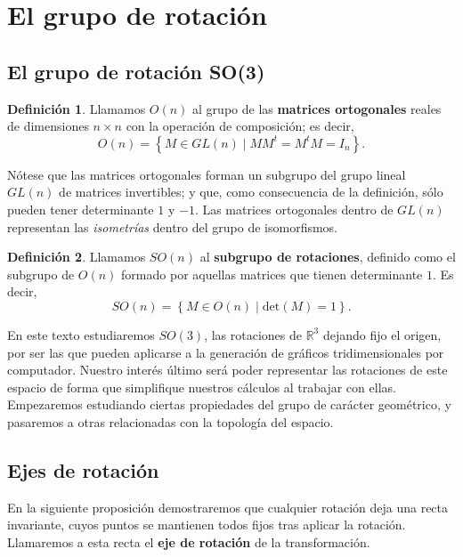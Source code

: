 \documentclass{article}
\theoremstyle{plain}
\theoremstyle{definition}
\newtheorem{definition}{Definición}
\theoremstyle{remark}
\begin{document}
\maketitle

\newpage
\tableofcontents
\newpage

\section{El grupo de rotación}
\subsection{El grupo de rotación SO(3)}

\begin{definition}
  Llamamos $O(n)$ al grupo de las \textbf{matrices ortogonales} reales
  de dimensiones $n \times n$ con la operación de composición; es
  decir,
  \[O(n) = \left\{ M \in GL(n) \mid MM^t=M^tM = I_n \right\}.\]
\end{definition}

Nótese que las matrices ortogonales forman un subgrupo del grupo
lineal $GL(n)$ de matrices invertibles; y que, como consecuencia de la definición, sólo
pueden tener determinante $1$ y $-1$. Las matrices ortogonales dentro
de $GL(n)$ representan las \textit{isometrías} dentro del grupo de isomorfismos.

\begin{definition}
  Llamamos $SO(n)$ al \textbf{subgrupo de rotaciones}, definido como
  el subgrupo de $O(n)$ formado por aquellas matrices que tienen
  determinante $1$. Es decir,
  \[SO(n) = \left\{ M \in O(n) \mid \mathrm{det}(M)=1 \right\}.\]
\end{definition}

En este texto estudiaremos $SO(3)$, las rotaciones de $\mathbb R^3$
dejando fijo el origen, por ser las que pueden aplicarse a la generación
de gráficos tridimensionales por computador. Nuestro interés último
será poder representar las rotaciones de este espacio de forma que
simplifique nuestros cálculos al trabajar con ellas.
Empezaremos estudiando ciertas propiedades del grupo de carácter
geométrico, y pasaremos a otras relacionadas con la topología del
espacio.


\subsection{Ejes de rotación}
En la siguiente proposición demostraremos que cualquier rotación deja
una recta invariante, cuyos puntos se mantienen todos fijos tras
aplicar la rotación. Llamaremos a esta recta el \textbf{eje de rotación}
de la transformación.
\end{document}
